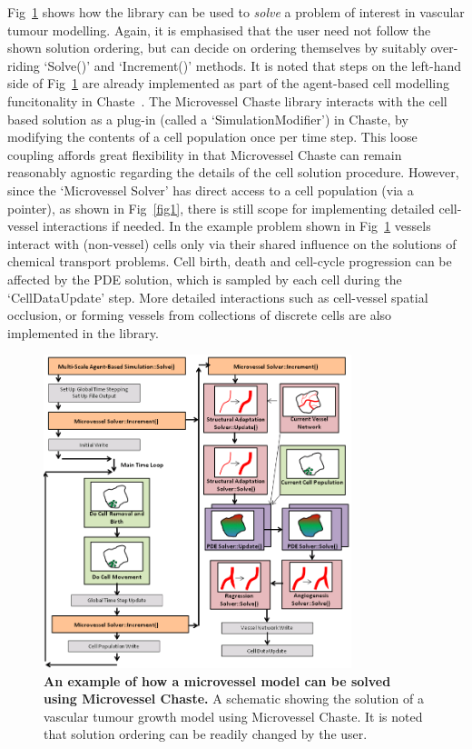 \documentclass[10pt,letterpaper]{article}
\begin{document}
Fig~\ref{fig2} shows how the library can be used to \emph{solve} a problem of interest in vascular tumour modelling. Again, it is emphasised that the user need not follow the shown solution ordering, but can decide on ordering themselves by suitably over-riding `Solve()' and `Increment()' methods. It is noted that steps on the left-hand side of Fig~\ref{fig2} are already implemented as part of the agent-based cell modelling funcitonality in Chaste~\cite{Mirams2013}. The Microvessel Chaste library interacts with the cell based solution as a plug-in (called a `SimulationModifier') in Chaste, by modifying the contents of a cell population once per time step. This loose coupling affords great flexibility in that Microvessel Chaste can remain reasonably agnostic regarding the details of the cell solution procedure. However, since the `Microvessel Solver' has direct access to a cell population (via a pointer), as shown in Fig~\ref{fig1}, there is still scope for implementing detailed cell-vessel interactions if needed. In the example problem shown in Fig~\ref{fig2} vessels interact with (non-vessel) cells only via their shared influence on the solutions of chemical transport problems. Cell birth, death and cell-cycle progression can be affected by the PDE solution, which is sampled by each cell during the `CellDataUpdate' step. More detailed interactions such as cell-vessel spatial occlusion, or forming vessels from collections of discrete cells are also implemented in the library.

\begin{figure}[!h]
\centering
\includegraphics[width=0.8\textwidth]{Fig2.png}
\caption{{\bf An example of how a microvessel model can be solved using Microvessel Chaste.}
A schematic showing the solution of a vascular tumour growth model using Microvessel Chaste. It is noted that solution ordering can be readily changed by the user.}
\label{fig2}
\end{figure}
\end{document}
